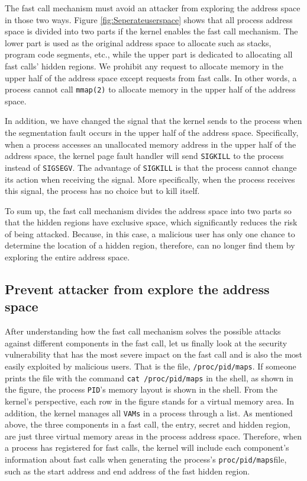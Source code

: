 The fast call mechanism must avoid an attacker from 
exploring the address space in those two ways. Figure 
\ref{fig:Seperateuserspace} shows that all process address space is divided into 
two parts if the kernel enables the fast call mechanism. 
The lower part is used as the original address space to 
allocate such as stacks, program code segments, etc., 
while the upper part is dedicated to allocating all 
fast calls' hidden regions.  We prohibit any request 
to allocate memory in the upper half of the address 
space except requests from fast calls. In other words, 
a process cannot call \verb|mmap(2)| to allocate memory in the 
upper half of the address space.

In addition, we have changed the signal that the kernel 
sends to the process when the segmentation fault occurs 
in the upper half of the address space. Specifically, 
when a process accesses an unallocated memory address 
in the upper half of the address space, the kernel page 
fault handler will send \verb|SIGKILL| to the process instead 
of \verb|SIGSEGV|. The advantage of \verb|SIGKILL| is that the process 
cannot change its action when receiving the signal. 
More specifically, when the process receives this signal, 
the process has no choice but to kill itself.

To sum up, the fast call mechanism divides the address 
space into two parts so that the hidden regions have 
exclusive space, which significantly reduces the risk 
of being attacked. Because, in this case, a malicious 
user has only one chance to determine the location of 
a hidden region, therefore, can no longer find them by
 exploring the entire address space.


\subsection{Prevent attacker from explore the address space}
After understanding how the fast call mechanism solves the 
possible attacks against different components in the fast call, 
let us finally look at the security vulnerability that has the most 
severe impact on the fast call and is also the most easily exploited 
by malicious users. That is the file, \verb|/proc/pid/maps|.
If someone prints the file with the command \verb|cat /proc/pid/maps| in the shell, 
as shown in the figure, the process \verb|PID|'s memory layout is shown in the shell. 
From the kernel's perspective, each row in the figure stands for a virtual 
memory area. In addition, the kernel manages all \verb|VAMs| in a process through a list. 
As mentioned above, the three components in a fast call, the entry, secret and hidden region, are just 
three virtual memory areas in the process address space. Therefore, when 
a process has registered for fast calls, the kernel will include each 
component's information about fast calls when generating the process's 
\verb|proc/pid/maps|file, such as the start address and end address of the fast 
hidden region.


